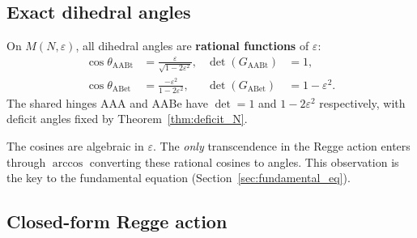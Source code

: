 \subsection{Exact dihedral angles}
\label{sec:exact_dihedrals}

\begin{theorem}
\label{thm:exact_dihedrals}
On $M(N,\varepsilon)$, all dihedral angles are \textbf{rational functions} of $\varepsilon$:
\begin{align}
\cos\theta_{\mathrm{AABt}} &= \frac{\varepsilon}{\sqrt{1 - 2\varepsilon^2}}, &
\det(G_{\mathrm{AABt}}) &= 1, \\[4pt]
\cos\theta_{\mathrm{ABet}} &= \frac{-\varepsilon^2}{1 - 2\varepsilon^2}, &
\det(G_{\mathrm{ABet}}) &= 1 - \varepsilon^2.
\end{align}
The shared hinges AAA and AABe have $\det = 1$ and $1\!-\!2\varepsilon^2$ respectively, with deficit angles fixed by Theorem~\ref{thm:deficit_N}.
\end{theorem}

\begin{remark}
The cosines are algebraic in $\varepsilon$.  The \emph{only} transcendence in the Regge action enters through $\arccos$ converting these rational cosines to angles.  This observation is the key to the fundamental equation (Section~\ref{sec:fundamental_eq}).
\end{remark}

\subsection{Closed-form Regge action}
\label{sec:closed_action}


